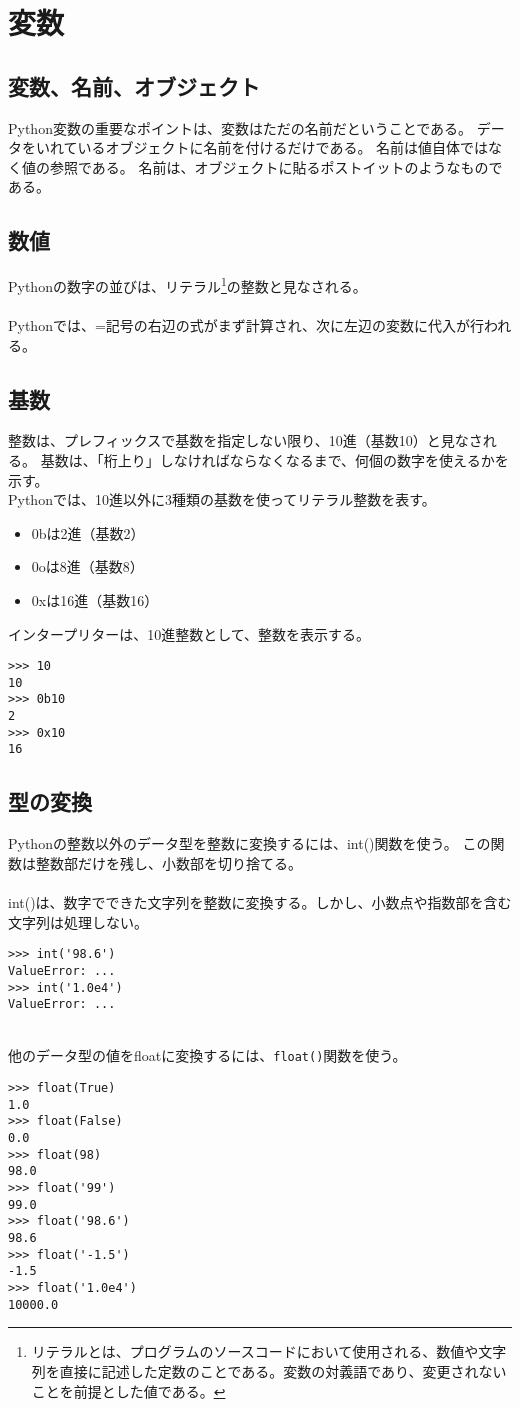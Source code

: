 \documentclass[11pt, oneside]{article}   	%
\begin{document}
\section{変数}
\subsection{変数、名前、オブジェクト}
Python変数の重要なポイントは、変数はただの名前だということである。
データをいれているオブジェクトに名前を付けるだけである。
名前は値自体ではなく値の参照である。
名前は、オブジェクトに貼るポストイットのようなものである。

\subsection{数値}
Pythonの数字の並びは、リテラル\footnote{リテラルとは、プログラムのソースコードにおいて使用される、数値や文字列を直接に記述した定数のことである。変数の対義語であり、変更されないことを前提とした値である。}の整数と見なされる。\\
　\\
Pythonでは、=記号の右辺の式がまず計算され、次に左辺の変数に代入が行われる。

\subsection{基数}
整数は、プレフィックスで基数を指定しない限り、10進（基数10）と見なされる。
基数は、「桁上り」しなければならなくなるまで、何個の数字を使えるかを示す。\\
Pythonでは、10進以外に3種類の基数を使ってリテラル整数を表す。
\begin{itemize}
\item 0bは2進（基数2）
\item 0oは8進（基数8）
\item 0xは16進（基数16）
\end{itemize}
インタープリターは、10進整数として、整数を表示する。
\begin{lstlisting}
>>> 10
10
>>> 0b10
2
>>> 0x10
16
\end{lstlisting}

\subsection{型の変換}
Pythonの整数以外のデータ型を整数に変換するには、int()関数を使う。
この関数は整数部だけを残し、小数部を切り捨てる。\\
　\\
int()は、数字でできた文字列を整数に変換する。しかし、小数点や指数部を含む文字列は処理しない。
\begin{lstlisting}
>>> int('98.6')
ValueError: ...
>>> int('1.0e4')
ValueError: ...
\end{lstlisting}
　\\
他のデータ型の値をfloatに変換するには、\verb|float()|関数を使う。
\begin{lstlisting}
>>> float(True)
1.0
>>> float(False)
0.0
>>> float(98)
98.0
>>> float('99')
99.0
>>> float('98.6')
98.6
>>> float('-1.5')
-1.5
>>> float('1.0e4')
10000.0
\end{lstlisting}
\end{document}
